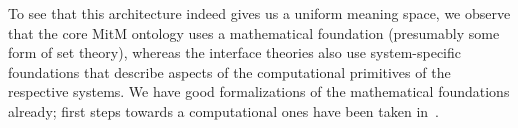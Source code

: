 To see that this architecture indeed gives us a uniform meaning space, we observe that the
core MitM ontology uses a mathematical foundation (presumably some form of set theory),
whereas the interface theories also use system-specific foundations that describe aspects
of the computational primitives of the respective systems. We have good formalizations of
the mathematical foundations already; first steps towards a computational ones have been
taken in~\cite{KohManRab:aumftg13}.


